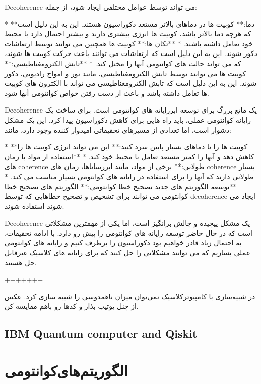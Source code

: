 \documentclass{book}
\begin{document}
Decoherence می تواند توسط عوامل مختلفی ایجاد شود، از جمله:

* **دما:** کوبیت ها در دماهای بالاتر مستعد دکوراسیون هستند. این به این دلیل است که هرچه دما بالاتر باشد، کوبیت ها انرژی بیشتری دارند و بیشتر احتمال دارد با محیط خود تعامل داشته باشند.
* **تکان ها:** کوبیت ها همچنین می توانند توسط ارتعاشات دکور شوند. این به این دلیل است که ارتعاشات می توانند باعث حرکت کوبیت ها شوند، که می تواند حالت های کوانتومی آنها را مختل کند.
* **تابش الکترومغناطیسی:** کوبیت ها می توانند توسط تابش الکترومغناطیسی، مانند نور و امواج رادیویی، دکور شوند. این به این دلیل است که تابش الکترومغناطیسی می تواند با الکترون های کوبیت ها تعامل داشته باشد و باعث از دست رفتن خواص کوانتومی آنها شود.

Decoherence یک مانع بزرگ برای توسعه ابررایانه های کوانتومی است. برای ساخت یک رایانه کوانتومی عملی، باید راه هایی برای کاهش دکوراسیون پیدا کرد. این یک مشکل دشوار است، اما تعدادی از مسیرهای تحقیقاتی امیدوار کننده وجود دارد، مانند:

* **کوبیت ها را تا دماهای بسیار پایین سرد کنید:** این می تواند انرژی کوبیت ها را کاهش دهد و آنها را کمتر مستعد تعامل با محیط خود کند.
* **استفاده از مواد با زمان های coherence طولانی:** برخی از مواد، مانند ابررساناها، زمان های coherence بسیار طولانی دارند که آنها را برای استفاده در رایانه های کوانتومی بسیار مناسب می کند.
* **توسعه الگوریتم های جدید تصحیح خطا کوانتومی:** الگوریتم های تصحیح خطا کوانتومی می توانند برای تشخیص و تصحیح خطاهایی که توسط decoherence ایجاد می شوند استفاده شوند.

Decoherence یک مشکل پیچیده و چالش برانگیز است، اما یکی از مهمترین مشکلاتی است که در حال حاضر توسعه رایانه های کوانتومی را پیش رو دارد. با ادامه تحقیقات، به احتمال زیاد قادر خواهیم بود دکوراسیون را برطرف کنیم و رایانه های کوانتومی عملی بسازیم که می توانند مشکلاتی را حل کنند که برای رایانه های کلاسیک غیرقابل حل هستند.

+++++++

در شبیه‌سازی با کامپیوترکلاسیک نمی‌توان میزان ناهمدوسی را شبیه سازی کرد. 
عکس از چنل یوتیب بذار و کدها رو باهم مقایسه کن.

\newpage


\section{IBM Quantum computer and Qiskit}
\newpage



\chapter{الگوریتم‌های‌کوانتومی‌}
\end{document}
